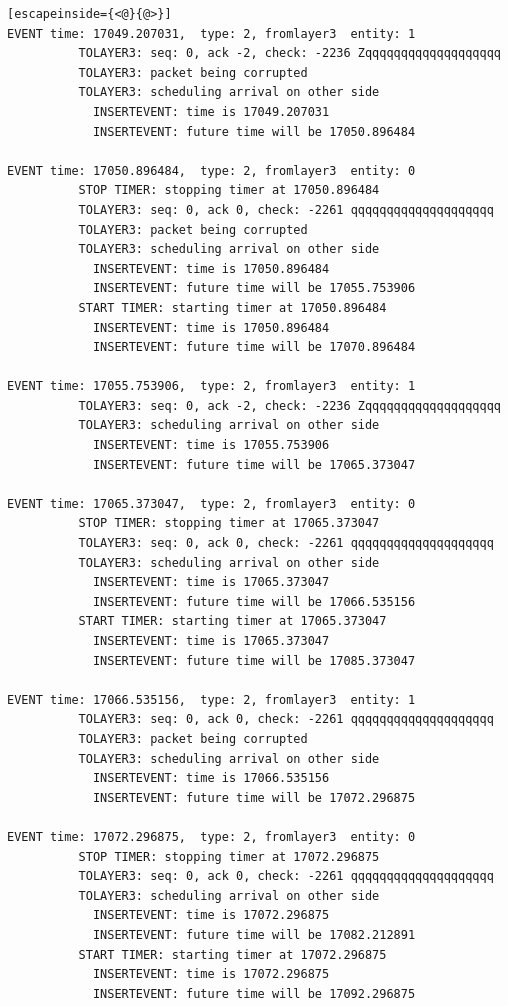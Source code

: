 \documentclass[paper=a4, fontsize=11pt]{scrartcl}
\numberwithin{equation}{section}		%
\numberwithin{figure}{section}			%
\numberwithin{table}{section}				%
\begin{document}
\begin{lstlisting}[escapeinside={<@}{@>}]
EVENT time: 17049.207031,  type: 2, fromlayer3  entity: 1
          TOLAYER3: seq: 0, ack -2, check: -2236 Zqqqqqqqqqqqqqqqqqqq
          TOLAYER3: packet being corrupted
          TOLAYER3: scheduling arrival on other side
            INSERTEVENT: time is 17049.207031
            INSERTEVENT: future time will be 17050.896484

EVENT time: 17050.896484,  type: 2, fromlayer3  entity: 0
          STOP TIMER: stopping timer at 17050.896484
          TOLAYER3: seq: 0, ack 0, check: -2261 qqqqqqqqqqqqqqqqqqqq
          TOLAYER3: packet being corrupted
          TOLAYER3: scheduling arrival on other side
            INSERTEVENT: time is 17050.896484
            INSERTEVENT: future time will be 17055.753906
          START TIMER: starting timer at 17050.896484
            INSERTEVENT: time is 17050.896484
            INSERTEVENT: future time will be 17070.896484

EVENT time: 17055.753906,  type: 2, fromlayer3  entity: 1
          TOLAYER3: seq: 0, ack -2, check: -2236 Zqqqqqqqqqqqqqqqqqqq
          TOLAYER3: scheduling arrival on other side
            INSERTEVENT: time is 17055.753906
            INSERTEVENT: future time will be 17065.373047

EVENT time: 17065.373047,  type: 2, fromlayer3  entity: 0
          STOP TIMER: stopping timer at 17065.373047
          TOLAYER3: seq: 0, ack 0, check: -2261 qqqqqqqqqqqqqqqqqqqq
          TOLAYER3: scheduling arrival on other side
            INSERTEVENT: time is 17065.373047
            INSERTEVENT: future time will be 17066.535156
          START TIMER: starting timer at 17065.373047
            INSERTEVENT: time is 17065.373047
            INSERTEVENT: future time will be 17085.373047

EVENT time: 17066.535156,  type: 2, fromlayer3  entity: 1
          TOLAYER3: seq: 0, ack 0, check: -2261 qqqqqqqqqqqqqqqqqqqq
          TOLAYER3: packet being corrupted
          TOLAYER3: scheduling arrival on other side
            INSERTEVENT: time is 17066.535156
            INSERTEVENT: future time will be 17072.296875

EVENT time: 17072.296875,  type: 2, fromlayer3  entity: 0
          STOP TIMER: stopping timer at 17072.296875
          TOLAYER3: seq: 0, ack 0, check: -2261 qqqqqqqqqqqqqqqqqqqq
          TOLAYER3: scheduling arrival on other side
            INSERTEVENT: time is 17072.296875
            INSERTEVENT: future time will be 17082.212891
          START TIMER: starting timer at 17072.296875
            INSERTEVENT: time is 17072.296875
            INSERTEVENT: future time will be 17092.296875


\end{lstlisting}
\end{document}
